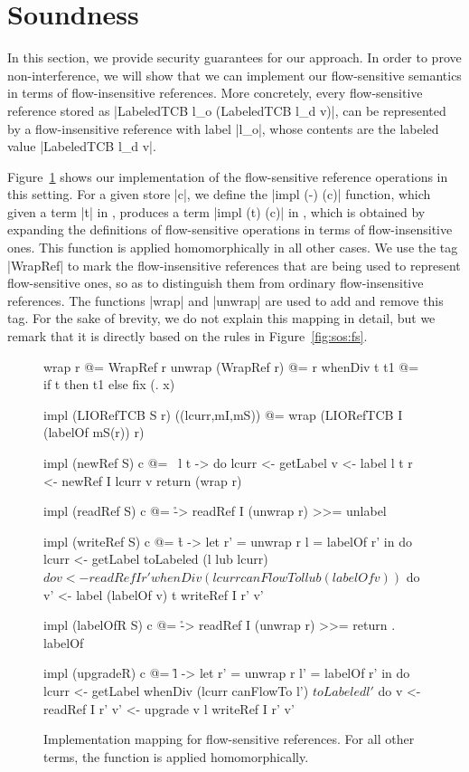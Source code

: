 \section{Soundness}
\label{sec:soundness}

In this section, we provide security guarantees for our approach. In
order to prove non-interference, we will show that we can implement
our flow-sensitive semantics in terms of flow-insensitive
references. More concretely, every flow-sensitive reference stored as
|LabeledTCB l_o (LabeledTCB l_d v)|, can be represented by a
flow-insensitive reference with label |l_o|, whose contents are the
labeled value |LabeledTCB l_d v|.

Figure~\ref{fig:fs-exts-semantics-impl} shows our implementation of
the flow-sensitive reference operations in this setting.  For a given
store |c|, we define the |impl (-) (c)| function, which given a term
|t| in \liofs{}, produces a term |impl (t) (c)| in \lio{}, which is
obtained by expanding the definitions of flow-sensitive operations in
terms of flow-insensitive ones. This function is applied
homomorphically in all other cases. We use the tag |WrapRef| to mark
the flow-insensitive references that are being used to represent
flow-sensitive ones, so as to distinguish them from ordinary
flow-insensitive references. The functions |wrap| and |unwrap| are
used to add and remove this tag. For the sake of brevity, we do not
explain this mapping in detail, but we remark that it is directly
based on the rules in Figure~\ref{fig:sos:fs}.

\begin{figure}
\small
\begin{code}
wrap r @= WrapRef r
unwrap (WrapRef r) @= r
whenDiv t t1 @= if t then t1 else fix (\x. x)

impl (LIORefTCB S r) ((lcurr,mI,mS)) @= wrap (LIORefTCB I (labelOf mS(r)) r)

impl (newRef S) c @= \ l t -> do
  lcurr  <- getLabel
  v      <- label l t
  r      <- newRef I lcurr v
  return (wrap r)


impl (readRef S) c @= \r -> readRef I (unwrap r) >>= unlabel


impl (writeRef S) c @= \r t -> let  r'  = unwrap r
                                    l   = labelOf r' in do
  lcurr <- getLabel
  toLabeled (l lub lcurr) $ do
     v   <- readRef I r'
     whenDiv (lcurr canFlowTo l lub (labelOf v)) $ do
       v'  <- label (labelOf v) t
       writeRef I r' v'


impl (labelOfR S) c @= \r -> readRef I (unwrap r) >>= return . labelOf

impl (upgradeR) c @= \r l -> let  r'  = unwrap r
                                  l'  = labelOf r' in do
  lcurr <- getLabel
  whenDiv (lcurr canFlowTo l') $ toLabeled l' $ do
     v   <- readRef I r'
     v'  <- upgrade v l
     writeRef I r' v'

\end{code}
\caption{Implementation mapping for flow-sensitive references. For all other terms, the function is applied homomorphically.\label{fig:fs-exts-semantics-impl}}
\end{figure}

